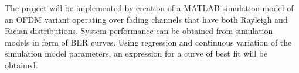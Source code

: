 
The project will be implemented by creation of a MATLAB simulation model of an \gls{OFDM} variant operating over fading channels that have both Rayleigh and Rician distributions. System performance can be obtained from simulation models in form of \gls{BER} curves. Using regression and continuous variation of the simulation model parameters, an expression for a curve of best fit will be obtained.

